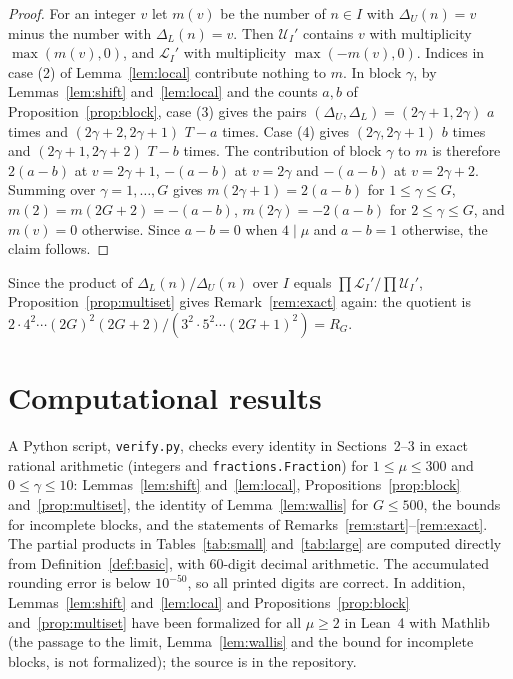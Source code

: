 \documentclass{amsart}
\theoremstyle{definition}
\theoremstyle{remark}
\newcommand{\DL}{\Delta_L}
\newcommand{\DU}{\Delta_U}
\begin{document}
\begin{proof}
For an integer $v$ let $m(v)$ be the number of $n\in I$ with $\DU(n)=v$ minus the number with $\DL(n)=v$. Then $\mathcal U_I'$ contains $v$ with multiplicity $\max(m(v),0)$, and $\mathcal L_I'$ with multiplicity $\max(-m(v),0)$. Indices in case (2) of Lemma~\ref{lem:local} contribute nothing to $m$. In block $\gamma$, by Lemmas~\ref{lem:shift} and~\ref{lem:local} and the counts $a,b$ of Proposition~\ref{prop:block}, case (3) gives the pairs $(\DU,\DL)=(2\gamma+1,2\gamma)$ $a$ times and $(2\gamma+2,2\gamma+1)$ $T-a$ times. Case (4) gives $(2\gamma,2\gamma+1)$ $b$ times and $(2\gamma+1,2\gamma+2)$ $T-b$ times. The contribution of block $\gamma$ to $m$ is therefore $2(a-b)$ at $v=2\gamma+1$, $-(a-b)$ at $v=2\gamma$ and $-(a-b)$ at $v=2\gamma+2$. Summing over $\gamma=1,\dots,G$ gives $m(2\gamma+1)=2(a-b)$ for $1\le\gamma\le G$, $m(2)=m(2G+2)=-(a-b)$, $m(2\gamma)=-2(a-b)$ for $2\le\gamma\le G$, and $m(v)=0$ otherwise. Since $a-b=0$ when $4\mid\mu$ and $a-b=1$ otherwise, the claim follows.
\end{proof}

Since the product of $\DL(n)/\DU(n)$ over $I$ equals $\prod\mathcal L_I'/\prod\mathcal U_I'$, Proposition~\ref{prop:multiset} gives Remark~\ref{rem:exact} again: the quotient is $2\cdot4^2\cdots(2G)^2(2G+2)/(3^2\cdot5^2\cdots(2G+1)^2)=R_G$.

\section{Computational results}\label{sec:computations}

A Python script, \texttt{verify.py}, checks every identity in Sections~2--3 in exact rational arithmetic (integers and \texttt{fractions.Fraction}) for $1\le\mu\le300$ and $0\le\gamma\le10$: Lemmas~\ref{lem:shift} and~\ref{lem:local}, Propositions~\ref{prop:block} and~\ref{prop:multiset}, the identity of Lemma~\ref{lem:wallis} for $G\le500$, the bounds for incomplete blocks, and the statements of Remarks~\ref{rem:start}--\ref{rem:exact}. The partial products in Tables~\ref{tab:small} and~\ref{tab:large} are computed directly from Definition~\ref{def:basic}, with $60$-digit decimal arithmetic. The accumulated rounding error is below $10^{-50}$, so all printed digits are correct. In addition, Lemmas~\ref{lem:shift} and~\ref{lem:local} and Propositions~\ref{prop:block} and~\ref{prop:multiset} have been formalized for all $\mu\ge2$ in Lean~4 with Mathlib (the passage to the limit, Lemma~\ref{lem:wallis} and the bound for incomplete blocks, is not formalized); the source is in the repository.
\end{document}
